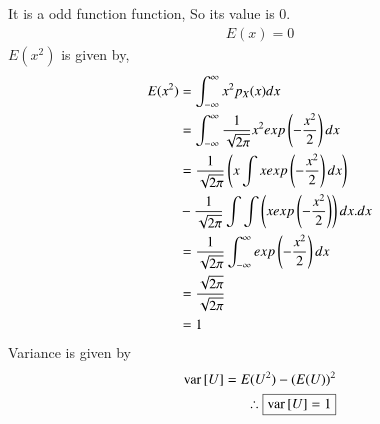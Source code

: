 \documentclass[journal,12pt,twocolumn]{IEEEtran}
\begin{document}
    It is a odd function function, So its value is 0.
    \begin{align}
        \boxed{E(x)=0}
    \end{align}
$E({x^2})$ is given by,
    \begin{align}
        E{(x^2)}&=\int_{-\infty}^{\infty}x^2p_X(x)dx \\
              &=\int_{-\infty}^{\infty}\frac{1}{\sqrt{2\pi}}x^2exp\left(-\frac{x^2}{2}\right)dx \\
              &=\frac{1}{\sqrt{2\pi}}\left(x\int x exp\left(-\frac{x^2}{2}\right)dx\right)\\
              &-\frac{1}{\sqrt{2\pi}}\int \int \left(x exp\left(-\frac{x^2}{2}\right)\right)dx. dx\\
              &=\frac{1}{\sqrt{2\pi}}\int_{-\infty}^{\infty}exp\left(-\frac{x^2}{2}\right)dx \\
              &=\frac{\sqrt{2\pi}}{\sqrt{2\pi}}\\&=1
    \end{align}
Variance is given by
    \begin{align}
        \text{var}{}\left[U\right]=E(U^2)-(E(U))^2\\
        \therefore \boxed{\text{var}{}\left[U\right]=1}
    \end{align}


\end{document}

